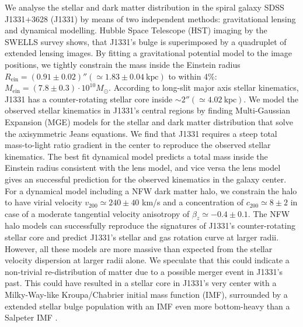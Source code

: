 We analyse the stellar and dark matter distribution in the spiral galaxy SDSS J1331+3628 (J1331) by means of two independent methods: gravitational lensing and dynamical modelling. Hubble Space Telescope (HST) imaging by the SWELLS survey shows, that J1331's bulge is superimposed by a quadruplet of extended lensing images. By fitting a gravitational potential model to the image positions, we tightly constrain the mass inside the Einstein radius $R_\text{ein}=(0.91\pm0.02)''(\simeq1.83\pm0.04~\text{kpc})$ to within 4\%: $M_\text{ein} = (7.8\pm0.3) \cdot 10^{10} M_\odot$. According to long-slit major axis stellar kinematics, J1331 has a counter-rotating stellar core inside $\sim 2''(\simeq4.02~\text{kpc})$. We model the observed stellar kinematics in J1331's central regions by finding Multi-Gaussian Expansion (MGE) models for the stellar and dark matter distribution that solve the axisymmetric Jeans equations. We find that J1331 requires a steep total mass-to-light ratio gradient in the center to reproduce the observed stellar kinematics. The best fit dynamical model predicts a total mass inside the Einstein radius consistent with the lens model, and vice versa the lens model gives an successful prediction for the observed kinematics in the galaxy center. For a dynamical model including a NFW dark matter halo,  we constrain the halo to have virial velocity $v_{200} \simeq 240 \pm 40$ km/s and a concentration of $c_{200} \simeq 8 \pm 2$ in case of a moderate tangential velocity anisotropy of $\beta_z \simeq -0.4 \pm 0.1$. The NFW halo models can successfully reproduce the signatures of J1331's counter-rotating stellar core and predict J1331's stellar and gas rotation curve at larger radii. However, all these models are more massive than expected from the stellar velocity dispersion at larger radii alone. We speculate that this could indicate a non-trivial re-distribution of matter due to a possible merger event in J1331's past. This could have resulted in a stellar core in J1331's very center with a Milky-Way-like Kroupa/Chabrier initial mass function (IMF), surrounded by a extended stellar bulge population with an IMF even more bottom-heavy than a Salpeter IMF .